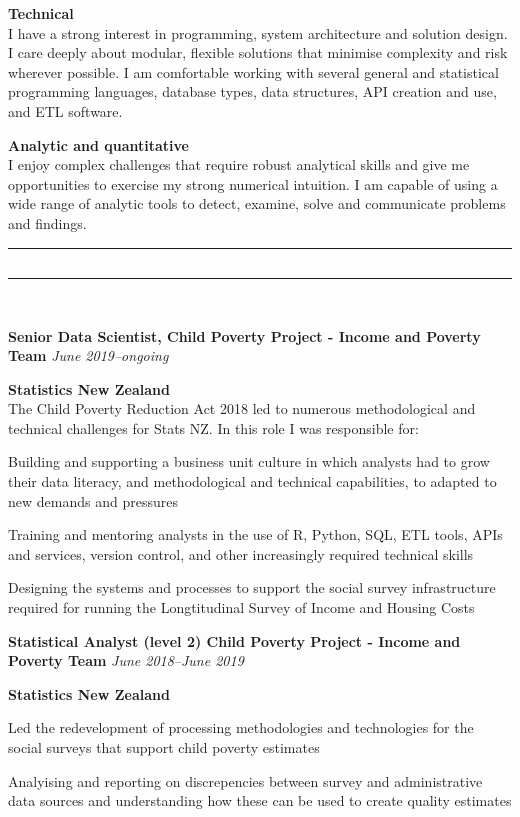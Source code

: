 \documentclass{article}[10pt] %
\newcommand{\heading}[1]{
	\vspace{22pt}
	\sectionline
	\subsection*{\color{titlecolour}\centering{#1}}	\sectionline \\
}
\newcommand{\jobtitle}[3]{
	\vspace{10 pt}
	\raggedleft\textbf{\color{altcolour}#1} \hfill \textit{#2} \\
	\raggedright\textbf{\color{soft}#3} 
	\\%
	}
\renewenvironment{itemize*}{

  \begin{list}{}{
    \itemsep 4pt
    \setlength{\leftmargin}{1.5em}
  }
}{
  \end{list}
    \vspace{7pt}
}
\newcommand{\sectionline}{%
  \vspace{-6pt}%
 {\centering\rule{\linewidth}{.7pt}}
  \vspace{-13pt}
}
\begin{document}
{\bfseries \color{altcolour}Technical} 
\\I have a strong interest in programming, system architecture and solution design. I care deeply about modular, flexible solutions that minimise complexity and risk wherever possible. I am comfortable working with several general and statistical programming languages, database types, data structures, API creation and use, and ETL software.\\
\vspace{10pt}

{\bfseries \color{altcolour}Analytic and quantitative} 
\\I enjoy complex challenges that require robust analytical skills and give me opportunities to exercise my strong numerical intuition. I am capable of using a wide range of analytic tools to detect, examine, solve and communicate problems and findings.\\
\vspace{10pt}

\heading{Relevant Work Experience}
\vspace{6pt}

\jobtitle{Senior Data Scientist, Child Poverty Project - Income and Poverty Team}{June 2019--ongoing}{Statistics New Zealand}
The Child Poverty Reduction Act 2018 led to numerous methodological and technical challenges for Stats NZ. In this role I was responsible for:\\
\begin{itemize*}
	\vspace{4pt}
	\item Building and supporting a business unit culture in which analysts had to grow their data literacy, and methodological and technical capabilities, to adapted to new demands and pressures 
	\item Training and mentoring analysts in the use of R, Python, SQL, ETL tools, APIs and services, version control, and other increasingly required technical skills
	\item Designing the systems and processes to support the social survey infrastructure required for running the Longtitudinal Survey of Income and Housing Costs
\end{itemize*}

\jobtitle{Statistical Analyst (level 2) Child Poverty Project - Income and Poverty Team}{June 2018--June 2019}{Statistics New Zealand}
\begin{itemize*}
	\vspace{4pt}
	\item Led the redevelopment of processing methodologies and technologies for the social surveys that support child poverty estimates
	\item Analyising and reporting on discrepencies between survey and administrative data sources and understanding how these can be used to create quality estimates
\end{itemize*}
\end{document}
